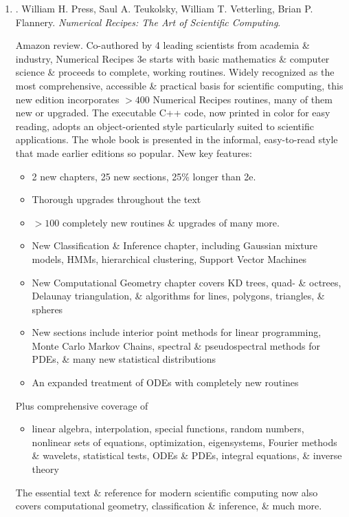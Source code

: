 \documentclass{article}
\begin{document}
\begin{enumerate}
	\item \cite{Press_Teukolsky_Vetterling_Flannery_recipe_C++}. {\sc William H. Press, Saul A. Teukolsky, William T. Vetterling, Brian P. Flannery}. {\it Numerical Recipes: The Art of Scientific Computing}. {}
	
	{\sf Amazon review.} Co-authored by 4 leading scientists from academia \& industry, Numerical Recipes 3e starts with basic mathematics \& computer science \& proceeds to complete, working routines. Widely recognized as the most comprehensive, accessible \& practical basis for scientific computing, this new edition incorporates $> 400$ Numerical Recipes routines, many of them new or upgraded. The executable C++ code, now printed in color for easy reading, adopts an object-oriented style particularly suited to scientific applications. The whole book is presented in the informal, easy-to-read style that made earlier editions so popular. New key features:
	\begin{itemize}
		\item 2 new chapters, 25 new sections, 25\% longer than 2e.
		\item Thorough upgrades throughout the text
		\item $> 100$ completely new routines \& upgrades of many more.
		\item New Classification \& Inference chapter, including Gaussian mixture models, HMMs, hierarchical clustering, Support Vector Machines
		\item New Computational Geometry chapter covers KD trees, quad- \& octrees, Delaunay triangulation, \& algorithms for lines, polygons, triangles, \& spheres
		\item New sections include interior point methods for linear programming, Monte Carlo Markov Chains, spectral \& pseudospectral methods for PDEs, \& many new statistical distributions
		\item An expanded treatment of ODEs with completely new routines
	\end{itemize}
	Plus comprehensive coverage of
	\begin{itemize}
		\item linear algebra, interpolation, special functions, random numbers, nonlinear sets of equations, optimization, eigensystems, Fourier methods \& wavelets, statistical tests, ODEs \& PDEs, integral equations, \& inverse theory
	\end{itemize}
	The essential text \& reference for modern scientific computing now also covers computational geometry, classification \& inference, \& much more.
	

\end{enumerate}
\end{document}
